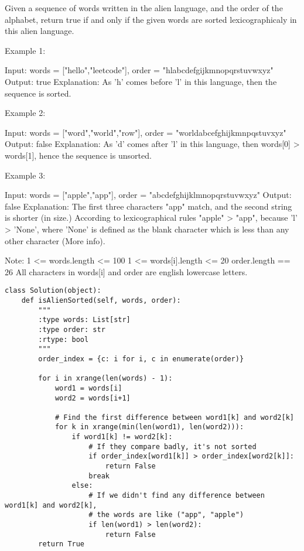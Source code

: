 Given a sequence of words written in the alien language, and the order of the alphabet, return true if and only if the given words are sorted lexicographicaly in this alien language.

Example 1:

Input: words = ["hello","leetcode"], order = "hlabcdefgijkmnopqrstuvwxyz"
Output: true
Explanation: As 'h' comes before 'l' in this language, then the sequence is sorted.

Example 2:

Input: words = ["word","world","row"], order = "worldabcefghijkmnpqstuvxyz"
Output: false
Explanation: As 'd' comes after 'l' in this language, then words[0] > words[1], hence the sequence is unsorted.

Example 3:

Input: words = ["apple","app"], order = "abcdefghijklmnopqrstuvwxyz"
Output: false
Explanation: The first three characters "app" match, and the second string is shorter (in size.) According to lexicographical rules "apple" > "app", because 'l' > 'None', where 'None' is defined as the blank character which is less than any other character (More info).

Note:
    1 <= words.length <= 100
    1 <= words[i].length <= 20
    order.length == 26
    All characters in words[i] and order are english lowercase letters.

\begin{lstlisting}
class Solution(object):
    def isAlienSorted(self, words, order):
        """
        :type words: List[str]
        :type order: str
        :rtype: bool
        """
        order_index = {c: i for i, c in enumerate(order)}

        for i in xrange(len(words) - 1):
            word1 = words[i]
            word2 = words[i+1]

            # Find the first difference between word1[k] and word2[k]
            for k in xrange(min(len(word1), len(word2))):
                if word1[k] != word2[k]:
                    # If they compare badly, it's not sorted
                    if order_index[word1[k]] > order_index[word2[k]]:
                        return False
                    break
                else:
                    # If we didn't find any difference between word1[k] and word2[k], 
                    # the words are like ("app", "apple")
                    if len(word1) > len(word2):
                        return False
        return True
\end{lstlisting}

